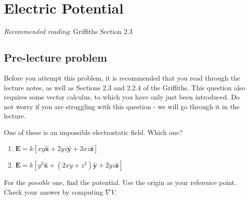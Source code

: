 \documentclass[
  letterpaper,
  DIV=11,
  numbers=noendperiod]{scrreprt}
\begin{document}

\chapter{Electric Potential}\label{electric-potential}

\newcommand{\l}{\mathrm{\mathbf{l}}}
\newcommand{\E}{\mathrm{\mathbf{E}}}
\newcommand{\F}{\mathrm{\mathbf{F}}}
\newcommand{\r}{\mathrm{\mathbf{r}}}
\newcommand{\B}{\mathrm{\mathbf{B}}}
\newcommand{\A}{\mathrm{\mathbf{A}}}
\newcommand{\x}{\mathrm{\mathbf{x}}}
\newcommand{\y}{\mathrm{\mathbf{y}}}
\newcommand{\z}{\mathrm{\mathbf{z}}}
\newcommand{\v}{\mathrm{\mathbf{v}}}
\newcommand{\p}{\mathrm{\mathbf{p}}}
\newcommand{\d}{\mathrm{\mathbf{d}}}

\newcommand{\a}{\mathrm{\mathbf{a}}}
\newcommand{\b}{\mathrm{\mathbf{b}}}
\newcommand{\I}{\mathrm{\mathbf{I}}}
\newcommand{\K}{\mathrm{\mathbf{K}}}
\newcommand{\J}{\mathrm{\mathbf{J}}}
\newcommand{\A}{\mathrm{\mathbf{A}}}
\newcommand{\dd}{\mathrm{d}}

\emph{Recommended reading}: Griffiths Section 2.3

\section{Pre-lecture problem}\label{pre-lecture-problem-1}

Before you attempt this problem, it is recommended that you read through
the lecture notes, as well as Sections 2.3 and 2.2.4 of the Griffiths.
This question also requires some vector calculus, to which you have only
just been introduced. Do not worry if you are struggling with this
question - we will go through it in the lecture.

One of these is an impossible electrostatic field. Which one?

\begin{enumerate}
\def\labelenumi{(\alph{enumi})}
\item
  \(\mathrm{\mathbf{E}}= k[ xy \hat{\mathrm{\mathbf{x}}} + 2yz \hat{\mathrm{\mathbf{y}}} + 3xz \hat{\mathrm{\mathbf{z}}} ]\)
\item
  \(\mathrm{\mathbf{E}}= k[ y^2 \hat{\mathrm{\mathbf{x}}} + (2xy + z^2)\hat{\mathrm{\mathbf{y}}} + 2yz \hat{\mathrm{\mathbf{z}}} ]\)
\end{enumerate}

For the \emph{possible} one, find the potential. Use the origin as your
reference point. Check your answer by computing \(\nabla V\).
\end{document}
